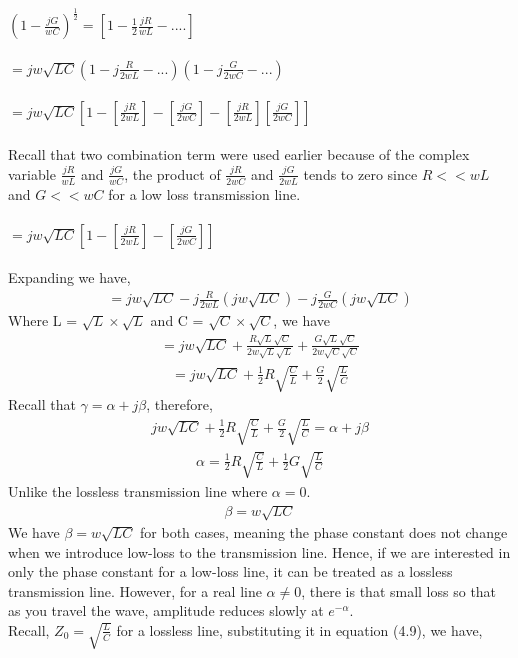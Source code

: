 $(1 - \frac{jG}{wC})^{\frac{1}{2}} =[1 - \frac{1}{2}\frac{jR}{wL} - ....]$\\\\
$= jw\sqrt{LC}(1 - j\frac{R}{2wL} - ...)(1 - j\frac{G}{2wC} - ...)$\\\\
$= jw\sqrt{LC} [1- [\frac{jR}{2wL}] - [\frac{jG}{2wC}] -  [\frac{jR}{2wL}][\frac{jG}{2wC}]]$\\\\
Recall that two combination term were used earlier because of the complex variable $\frac{jR}{wL}$ and $\frac{jG}{wC}$, the product of $\frac{jR}{2wC}$ and $\frac{jG}{2wL}$ tends to zero since $R << wL$ and $G << wC$ for a low loss transmission line.\\\\
$= jw\sqrt{LC} [1- [\frac{jR}{2wL}] - [\frac{jG}{2wC}]]$\\\\
Expanding we have,
\begin{align*}
= jw\sqrt{LC} - j\frac{R}{2wL}(jw\sqrt{LC}) - j\frac{G}{2wC}(jw\sqrt{LC})
\end{align*}
Where L = $\sqrt{L} \times \sqrt{L}$ and C = $\sqrt{C} \times \sqrt{C}$, we have
\begin{align*}
= jw\sqrt{LC} + \frac{R\sqrt{L}\sqrt{C}}{2w\sqrt{L}\sqrt{L}} + \frac{G\sqrt{L}\sqrt{C}}{2w\sqrt{C}\sqrt{C}}
\end{align*}
\begin{align*}
= jw\sqrt{LC} + \frac{1}{2}R\sqrt{\frac{C}{L}} + \frac{G}{2}\sqrt{\frac{L}{C}} 
\end{align*}
Recall that $\gamma = \alpha + j\beta$, therefore,
\begin{align*}
jw\sqrt{LC} + \frac{1}{2}R\sqrt{\frac{C}{L}} + \frac{G}{2}\sqrt{\frac{L}{C}} = \alpha + j\beta
\end{align*}
\begin{align}
\alpha = \frac{1}{2}R\sqrt{\frac{C}{L}} + \frac{1}{2}G\sqrt{\frac{L}{C}}
\end{align}
Unlike the lossless transmission line where $\alpha = 0$.
\begin{align}
\beta = w\sqrt{LC}
\end{align}
We have $\beta = w\sqrt{LC}$ for both cases, meaning the phase constant does not change when we introduce low-loss to the transmission line. Hence, if we are interested in only the phase constant for a low-loss line, it can be treated as a lossless transmission line. However, for a real line $\alpha \neq 0$, there is that small loss so that as you travel the wave, amplitude reduces slowly at $e^{-\alpha}$.\\ Recall, $Z_0 = \sqrt{\frac{L}{C}}$ for a lossless line, substituting it in equation (4.9), we have,\\\\
